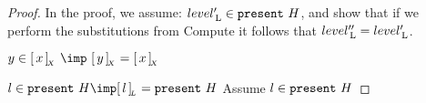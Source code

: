 \begin{proof}  In the proof, we assume: $level'_{\, \mathrm L} \in {\tt present}~H$, and show that if we perform the substitutions from {\sc Compute} it follows that $level''_{\, \mathrm L} = level'_{\, \mathrm L}$.


$y \in  \eqcl{x}{X} ~\imp~  \eqcl{y}{X} =  \eqcl{x}{X}$



$l \in \present~H \imp \eqcl{l}{L} = \present~H$
Assume $l \in {\tt present}~H$ 


\end{proof}


